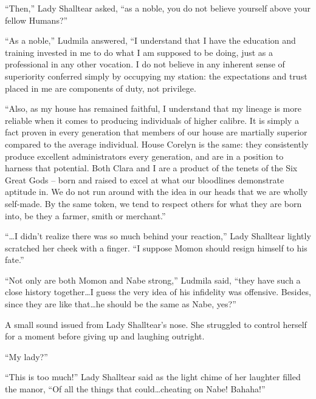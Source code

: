  

“Then,” Lady Shalltear asked, “as a noble, you do not believe yourself above your fellow Humans?”

 

“As a noble,” Ludmila answered, “I understand that I have the education and training invested in me to do what I am supposed to be doing, just as a professional in any other vocation. I do not believe in any inherent sense of superiority conferred simply by occupying my station: the expectations and trust placed in me are components of duty, not privilege.

 

“Also, as my house has remained faithful, I understand that my lineage is more reliable when it comes to producing individuals of higher calibre. It is simply a fact proven in every generation that members of our house are martially superior compared to the average individual. House Corelyn is the same: they consistently produce excellent administrators every generation, and are in a position to harness that potential. Both Clara and I are a product of the tenets of the Six Great Gods – born and raised to excel at what our bloodlines demonstrate aptitude in. We do not run around with the idea in our heads that we are wholly self-made. By the same token, we tend to respect others for what they are born into, be they a farmer, smith or merchant.”

 

“…I didn’t realize there was so much behind your reaction,” Lady Shalltear lightly scratched her cheek with a finger. “I suppose Momon should resign himself to his fate.”

 

“Not only are both Momon and Nabe strong,” Ludmila said, “they have such a close history together…I guess the very idea of his infidelity was offensive. Besides, since they are like that…he should be the same as Nabe, yes?”

 

A small sound issued from Lady Shalltear’s nose. She struggled to control herself for a moment before giving up and laughing outright.

 

“My lady?”

 

“This is too much!” Lady Shalltear said as the light chime of her laughter filled the manor, “Of all the things that could…cheating on Nabe! Bahaha!”

 

